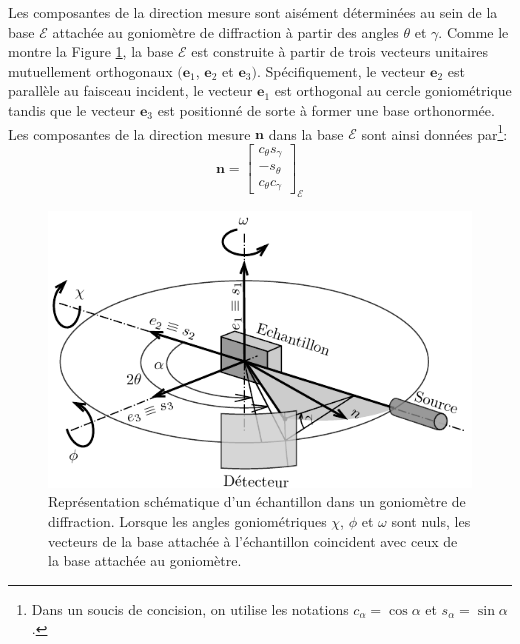 \documentclass[french,a4paper]{report}
\begin{document}
Les composantes de la direction mesure sont aisément déterminées au sein de la base $\mathcal{E}$ attachée au goniomètre de diffraction à partir des angles $\theta$ et $\gamma$. Comme le montre la Figure \ref{fig_bases}, la base $\mathcal{E}$ est construite à partir de trois vecteurs unitaires mutuellement orthogonaux $(\boldsymbol e_1$, $\boldsymbol e_2$ et $\boldsymbol e_3)$. Spécifiquement, le vecteur $\boldsymbol e_2$ est parallèle au faisceau incident, le vecteur $\boldsymbol e_1$ est orthogonal au cercle goniométrique tandis que le vecteur $\boldsymbol e_3$ est positionné de sorte à former une base orthonormée. Les composantes de la direction mesure $\boldsymbol n$ dans la base $\mathcal{E}$ sont ainsi données par\footnote{Dans un soucis de concision, on utilise les notations $c_\alpha=\cos \alpha$ et $s_\alpha=\sin \alpha$.}:
\begin{equation}
\boldsymbol n =
\begin{bmatrix}
c_\theta s_\gamma \\
-s_\theta  \\
c_\theta c_\gamma
\end{bmatrix}_{\mathcal{E}}
\end{equation}

\begin{figure}
\centering
\includegraphics{figures/bases.pdf}
\caption{Représentation schématique d'un échantillon dans un goniomètre de diffraction. Lorsque les angles goniométriques $\chi$, $\phi$ et $\omega$ sont nuls, les vecteurs de la base attachée à l'échantillon coincident avec ceux de la base attachée au goniomètre.}
\label{fig_bases}
\end{figure}
\end{document}
